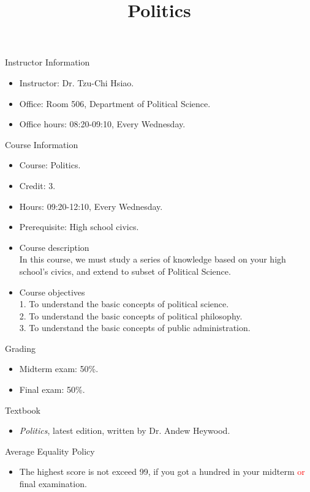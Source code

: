 \documentclass{article}
\title{\fontsize{16pt}{16pt}\selectfont Politics}
\author{}
\date{}
\begin{document}
\maketitle
\fontsize{14pt}{14pt}\selectfont
\begin{flushleft}
Instructor Information
\end{flushleft}
\begin{itemize}
\item Instructor: Dr. Tzu-Chi Hsiao. \\
\item Office: Room 506, Department of Political Science. \\
\item Office hours: 08:20-09:10, Every Wednesday. \\
\end{itemize}
Course Information \\
\begin{itemize}
\item Course: Politics. \\
\item Credit: 3. \\
\item Hours: 09:20-12:10, Every Wednesday. \\
\item Prerequisite: High school civics. \\
\item Course description \\
In this course, we must study a series of knowledge based on your high school's civics, and extend to subset of Political Science. \\ 
\item Course objectives \\
1. To understand the basic concepts of political science. \\
2. To understand the basic concepts of political philosophy. \\
3. To understand the basic concepts of public administration. \\
\end{itemize}
\newpage
\begin{flushleft}
Grading \\
\end{flushleft}
\begin{itemize}
\item Midterm exam: 50\%. \\
\item Final exam: 50\%. \\
\end{itemize}
Textbook \\
\begin{itemize}
\item \textit{Politics}, latest edition, written by Dr. Andew Heywood. \\
\end{itemize}
Average Equality Policy \\
\begin{itemize}
\item The highest score is not exceed 99, if you got a hundred in your midterm \textcolor{red}{or} final examination. \\
\end{itemize}
\end{document}
